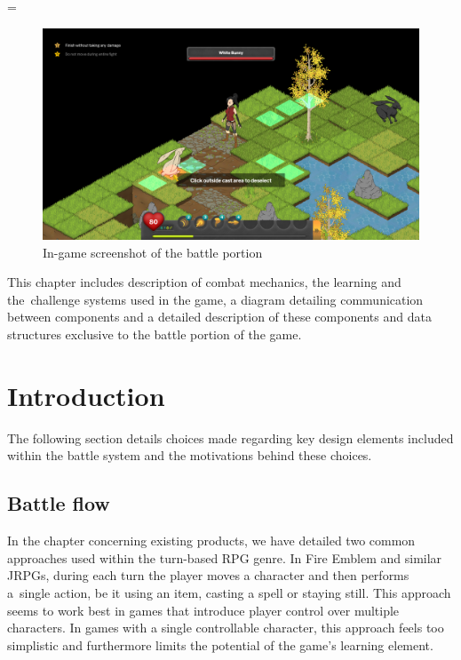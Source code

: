 \documentclass[thesis=B,english,hidelinks]{FITthesisXE}[2012/06/26]
\begin{document}
\emergencystretch=\maxdimen
{}

\begin{figure}[ht]
\centering
\includegraphics[scale=0.2]{battle}
\caption{In-game screenshot of the battle portion}
\label{fig:battle}
\end{figure}

This chapter includes description of combat mechanics, the learning and the~challenge systems used in the game, a diagram detailing communication between components and a detailed description of these components and data structures exclusive to the battle portion of the game.

\section{Introduction}

The following section details choices made regarding key design elements included within the battle system and the motivations behind these choices.

\subsection{Battle flow}

In the chapter concerning existing products, we have detailed two common approaches used within the turn-based RPG genre. In Fire Emblem and similar JRPGs, during each turn the player moves a character and then performs a~single action, be it using an item, casting a spell or staying still. This approach seems to work best in games that introduce player control over multiple characters. In games with a single controllable character, this approach feels too simplistic and furthermore limits the potential of the game's learning element.
\end{document}

